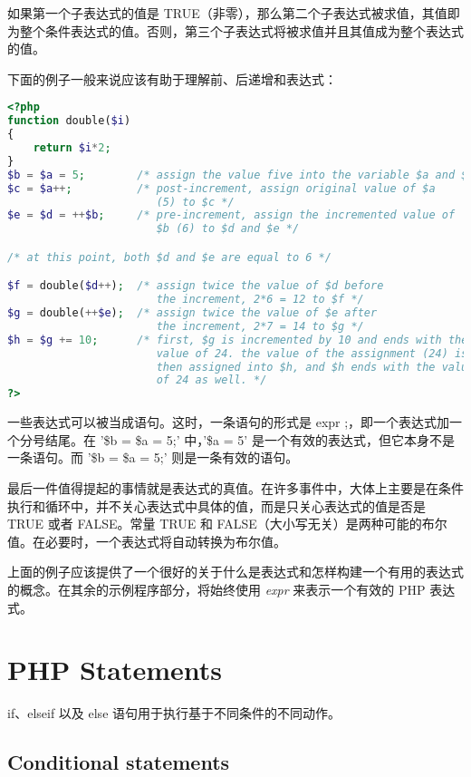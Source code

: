 如果第一个子表达式的值是 TRUE（非零），那么第二个子表达式被求值，其值即为整个条件表达式的值。否则，第三个子表达式将被求值并且其值成为整个表达式的值。

下面的例子一般来说应该有助于理解前、后递增和表达式：


\begin{lstlisting}[language=PHP]
<?php
function double($i)
{
    return $i*2;
}
$b = $a = 5;        /* assign the value five into the variable $a and $b */
$c = $a++;          /* post-increment, assign original value of $a
                       (5) to $c */
$e = $d = ++$b;     /* pre-increment, assign the incremented value of
                       $b (6) to $d and $e */

/* at this point, both $d and $e are equal to 6 */

$f = double($d++);  /* assign twice the value of $d before
                       the increment, 2*6 = 12 to $f */
$g = double(++$e);  /* assign twice the value of $e after
                       the increment, 2*7 = 14 to $g */
$h = $g += 10;      /* first, $g is incremented by 10 and ends with the
                       value of 24. the value of the assignment (24) is
                       then assigned into $h, and $h ends with the value
                       of 24 as well. */
?>
\end{lstlisting}

一些表达式可以被当成语句。这时，一条语句的形式是 expr ;，即一个表达式加一个分号结尾。在 '\$b = \$a = 5;' 中，'\$a = 5' 是一个有效的表达式，但它本身不是一条语句。而 '\$b = \$a = 5;' 则是一条有效的语句。

最后一件值得提起的事情就是表达式的真值。在许多事件中，大体上主要是在条件执行和循环中，并不关心表达式中具体的值，而是只关心表达式的值是否是 TRUE 或者 FALSE。常量 TRUE 和 FALSE（大小写无关）是两种可能的布尔值。在必要时，一个表达式将自动转换为布尔值。

上面的例子应该提供了一个很好的关于什么是表达式和怎样构建一个有用的表达式的概念。在其余的示例程序部分，将始终使用 \textsl{expr} 来表示一个有效的 PHP 表达式。


\chapter{PHP Statements}




if、elseif 以及 else 语句用于执行基于不同条件的不同动作。



\section{Conditional statements}

